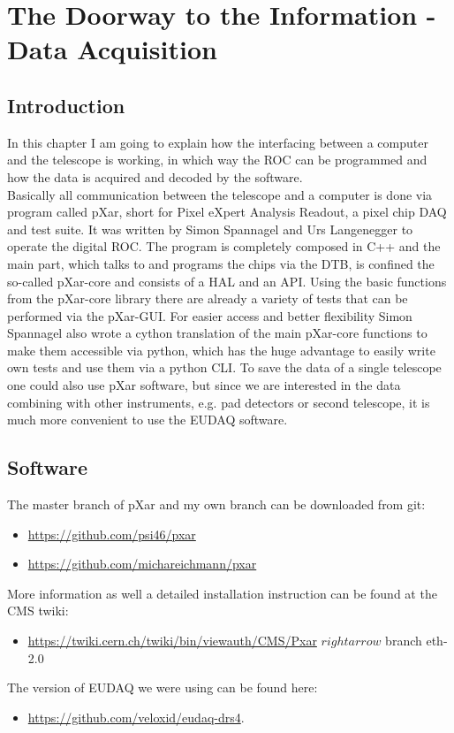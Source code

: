 \documentclass[british,11pt,a4paper]{memoir}
\begin{document}
\chapter{The Doorway to the Information - Data Acquisition}
\section{Introduction}
In this chapter I am going to explain how the interfacing between a computer and the telescope is working, in which way the \ac{ROC} can be programmed and how the data is acquired and decoded by the software.\\
Basically all communication between the telescope and a computer is done via program called pXar, short for Pixel eXpert Analysis Readout, a pixel chip \ac{DAQ} and test suite. It was written by Simon Spannagel and Urs Langenegger to operate the digital \ac{ROC}. The program is completely composed in C++ and the main part, which talks to and programs the chips via the \ac{DTB}, is confined the so-called pXar-core and consists of a \ac{HAL} and an \ac{API}. Using the basic functions from the pXar-core library there are already a variety of tests that can be performed via the pXar-\ac{GUI}. For easier access and better flexibility Simon Spannagel also wrote a cython translation of the main pXar-core functions to make them accessible via python, which has the huge advantage to easily write own tests and use them via a python \ac{CLI}. To save the data of a single telescope one could also use pXar software, but since we are interested in the data combining with other instruments, e.g. pad detectors or second telescope, it is much more convenient to use the EUDAQ software.
\section{Software}
The master branch of pXar and my own branch can be downloaded from git: 
\begin{itemize}
	\item \url{https://github.com/psi46/pxar}
	\item \url{https://github.com/michareichmann/pxar}
\end{itemize}
More information as well a detailed installation instruction can be found at the \ac{CMS} twiki: 
\begin{itemize}
	\item \url{https://twiki.cern.ch/twiki/bin/viewauth/CMS/Pxar} $rightarrow$ branch eth-2.0
\end{itemize}
The version of EUDAQ we were using can be found here: 
\begin{itemize}
	\item \url{https://github.com/veloxid/eudaq-drs4}. 
\end{itemize}
\end{document}
